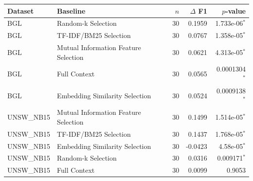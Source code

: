 \begin{tabular}{llrrr}
\toprule
Dataset & Baseline & $n$ & $\Delta$ F1 & $p$-value \\
\midrule
BGL & Random-k Selection & 30 & 0.1959 & 1.733e-06$^*$ \\
BGL & TF-IDF/BM25 Selection & 30 & 0.0767 & 1.358e-05$^*$ \\
BGL & Mutual Information Feature Selection & 30 & 0.0621 & 4.313e-05$^*$ \\
BGL & Full Context & 30 & 0.0565 & 0.0001304$^*$ \\
BGL & Embedding Similarity Selection & 30 & 0.0524 & 0.0009138$^*$ \\
UNSW_NB15 & Mutual Information Feature Selection & 30 & 0.1499 & 1.514e-05$^*$ \\
UNSW_NB15 & TF-IDF/BM25 Selection & 30 & 0.1437 & 1.768e-05$^*$ \\
UNSW_NB15 & Embedding Similarity Selection & 30 & -0.0423 & 4.58e-05$^*$ \\
UNSW_NB15 & Random-k Selection & 30 & 0.0316 & 0.009171$^*$ \\
UNSW_NB15 & Full Context & 30 & 0.0099 & 0.9053 \\
\bottomrule
\end{tabular}
